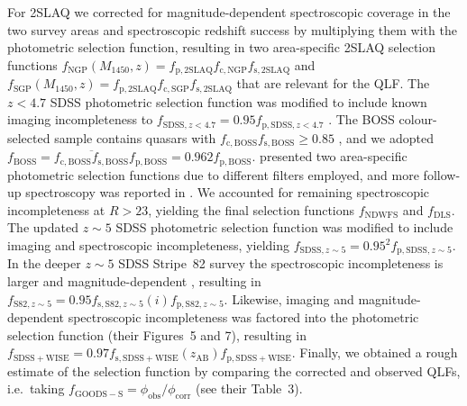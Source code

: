 \documentclass[fleqn,usenatbib]{mnras}
\begin{document}
For 2SLAQ we corrected for magnitude-dependent spectroscopic coverage
in the two survey areas \citep[$f_\mathrm{c,NGP}\left(g\right)$ and
  $f_\mathrm{c,SGP}\left(g\right)$; Figure~4
  in][]{2009MNRAS.392...19C} and spectroscopic redshift success
\citep[$f_\mathrm{s,2SLAQ}\left(g\right)$; Figure~6b
  in][]{2009MNRAS.392...19C} by multiplying them with the photometric
selection function, resulting in two area-specific 2SLAQ selection
functions
$f_\mathrm{NGP}\left(M_{1450},z\right)=f_\mathrm{p,2SLAQ}f_\mathrm{c,NGP}f_\mathrm{s,2SLAQ}$
and
$f_\mathrm{SGP}\left(M_{1450},z\right)=f_\mathrm{p,2SLAQ}f_\mathrm{c,SGP}f_\mathrm{s,2SLAQ}$
that are relevant for the QLF.  The $z<4.7$ SDSS photometric selection
function was modified to include known imaging incompleteness to
$f_{\mathrm{SDSS},z<4.7}=0.95f_{\mathrm{p,SDSS},z<4.7}$
\citep{2006AJ....131.2766R}. The BOSS colour-selected sample contains
quasars with $f_\mathrm{c,BOSS}f_\mathrm{s,BOSS}\ge 0.85$
\citep{2013ApJ...773...14R}, and we adopted
$f_\mathrm{BOSS}=\overline{f_\mathrm{c,BOSS}f_\mathrm{s,BOSS}}f_\mathrm{p,BOSS}=0.962f_\mathrm{p,BOSS}$. \citet{2010ApJ...710.1498G}
presented two area-specific photometric selection functions due to
different filters employed, and more follow-up spectroscopy was
reported in \citet{2011ApJ...728L..26G}. We accounted for remaining
spectroscopic incompleteness at $R>23$, yielding the final selection
functions $f_\mathrm{NDWFS}$ and $f_\mathrm{DLS}$. The updated $z\sim
5$ SDSS photometric selection function \citep{2013ApJ...768..105M} was
modified to include imaging and spectroscopic incompleteness, yielding
$f_{\mathrm{SDSS},z\sim 5}=0.95^2f_{\mathrm{p,SDSS},z\sim 5}$. In the
deeper $z\sim 5$ SDSS Stripe~82 survey the spectroscopic
incompleteness is larger and magnitude-dependent \citep[Figure~14
  in][]{2013ApJ...768..105M}, resulting in $f_{\mathrm{S82},z\sim
  5}=0.95f_{\mathrm{s,S82},z\sim
  5}\left(i\right)f_{\mathrm{p,S82},z\sim 5}$. Likewise, imaging and
magnitude-dependent spectroscopic incompleteness was factored into the
\citet{2016ApJ...829...33Y} photometric selection function (their
Figures~5 and 7), resulting in
$f_\mathrm{SDSS+WISE}=0.97f_\mathrm{s,SDSS+WISE}\left(z_\mathrm{AB}\right)f_\mathrm{p,SDSS+WISE}$. Finally,
we obtained a rough estimate of the \citet{2015AA...578A..83G}
selection function by comparing the corrected and observed QLFs,
i.e.\ taking $f_\mathrm{GOODS-S}=\phi_\mathrm{obs}/\phi_\mathrm{corr}$
(see their Table~3).


\end{document}
